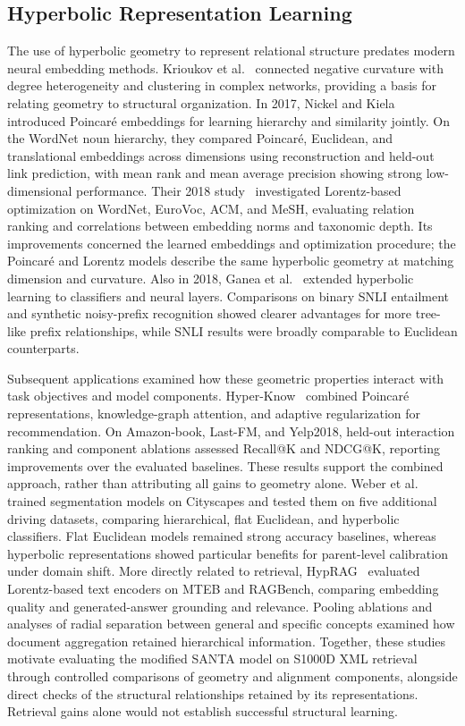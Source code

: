 \subsection{Hyperbolic Representation Learning}
The use of hyperbolic geometry to represent relational structure predates modern neural embedding methods. Krioukov et al.~\cite{krioukov2010hyperbolic} connected negative curvature with degree heterogeneity and clustering in complex networks, providing a basis for relating geometry to structural organization. In 2017, Nickel and Kiela~\cite{nickel2017poincare} introduced Poincar\'e embeddings for learning hierarchy and similarity jointly. On the WordNet noun hierarchy, they compared Poincar\'e, Euclidean, and translational embeddings across dimensions using reconstruction and held-out link prediction, with mean rank and mean average precision showing strong low-dimensional performance. Their 2018 study~\cite{nickel2018learning} investigated Lorentz-based optimization on WordNet, EuroVoc, ACM, and MeSH, evaluating relation ranking and correlations between embedding norms and taxonomic depth. Its improvements concerned the learned embeddings and optimization procedure; the Poincar\'e and Lorentz models describe the same hyperbolic geometry at matching dimension and curvature. Also in 2018, Ganea et al.~\cite{ganea2018hyperbolic} extended hyperbolic learning to classifiers and neural layers. Comparisons on binary SNLI entailment and synthetic noisy-prefix recognition showed clearer advantages for more tree-like prefix relationships, while SNLI results were broadly comparable to Euclidean counterparts.

Subsequent applications examined how these geometric properties interact with task objectives and model components. Hyper-Know~\cite{ma2021knowledge} combined Poincar\'e representations, knowledge-graph attention, and adaptive regularization for recommendation. On Amazon-book, Last-FM, and Yelp2018, held-out interaction ranking and component ablations assessed Recall@K and NDCG@K, reporting improvements over the evaluated baselines. These results support the combined approach, rather than attributing all gains to geometry alone. Weber et al.~\cite{weber2024flattening} trained segmentation models on Cityscapes and tested them on five additional driving datasets, comparing hierarchical, flat Euclidean, and hyperbolic classifiers. Flat Euclidean models remained strong accuracy baselines, whereas hyperbolic representations showed particular benefits for parent-level calibration under domain shift. More directly related to retrieval, HypRAG~\cite{madhu2026hyprag} evaluated Lorentz-based text encoders on MTEB and RAGBench, comparing embedding quality and generated-answer grounding and relevance. Pooling ablations and analyses of radial separation between general and specific concepts examined how document aggregation retained hierarchical information. Together, these studies motivate evaluating the modified SANTA model on S1000D XML retrieval through controlled comparisons of geometry and alignment components, alongside direct checks of the structural relationships retained by its representations. Retrieval gains alone would not establish successful structural learning.

